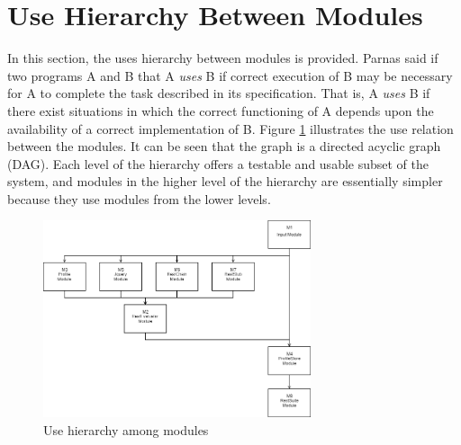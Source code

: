 \documentclass[12pt, titlepage]{article}
\begin{document}
\section{Use Hierarchy Between Modules} \label{SecUse}

In this section, the uses hierarchy between modules is
provided. Parnas said if two programs A and B that A {\em uses} B if
correct execution of B may be necessary for A to complete the task described in
its specification. That is, A {\em uses} B if there exist situations in which
the correct functioning of A depends upon the availability of a correct
implementation of B.  Figure \ref{FigUH} illustrates the use relation between
the modules. It can be seen that the graph is a directed acyclic graph
(DAG). Each level of the hierarchy offers a testable and usable subset of the
system, and modules in the higher level of the hierarchy are essentially simpler because they use modules from the lower levels.

\begin{figure}[H]
\centering
\includegraphics[width=0.7\textwidth]{UsesHierarchy.png}
\caption{Use hierarchy among modules}
\label{FigUH}
\end{figure}
\end{document}
